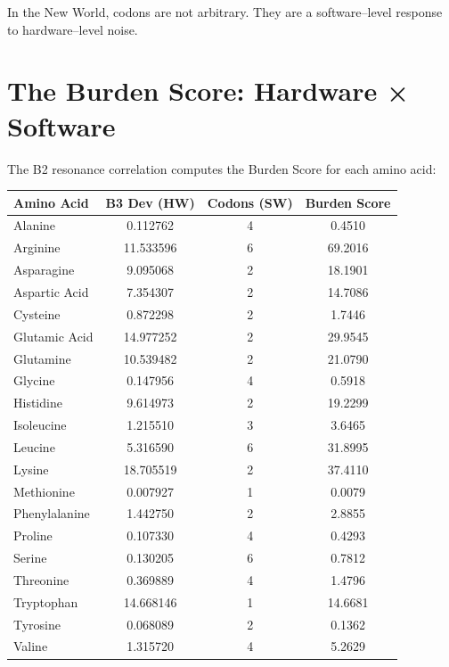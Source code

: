 \documentclass[11pt, letterpaper, openany]{book}
\begin{document}
In the New World, codons are not arbitrary.  
They are a software–level response to hardware–level noise.

\section{The Burden Score: Hardware × Software}

The B2 resonance correlation computes the Burden Score for each amino acid:

\begin{center}
\begin{tabular}{lccc}
\toprule
\textbf{Amino Acid} & \textbf{B3 Dev (HW)} & \textbf{Codons (SW)} & \textbf{Burden Score} \\
\midrule
Alanine        & 0.112762  & 4 & 0.4510 \\
Arginine       & 11.533596 & 6 & 69.2016 \\
Asparagine     & 9.095068  & 2 & 18.1901 \\
Aspartic Acid  & 7.354307  & 2 & 14.7086 \\
Cysteine       & 0.872298  & 2 & 1.7446 \\
Glutamic Acid  & 14.977252 & 2 & 29.9545 \\
Glutamine      & 10.539482 & 2 & 21.0790 \\
Glycine        & 0.147956  & 4 & 0.5918 \\
Histidine      & 9.614973  & 2 & 19.2299 \\
Isoleucine     & 1.215510  & 3 & 3.6465 \\
Leucine        & 5.316590  & 6 & 31.8995 \\
Lysine         & 18.705519 & 2 & 37.4110 \\
Methionine     & 0.007927  & 1 & 0.0079 \\
Phenylalanine  & 1.442750  & 2 & 2.8855 \\
Proline        & 0.107330  & 4 & 0.4293 \\
Serine         & 0.130205  & 6 & 0.7812 \\
Threonine      & 0.369889  & 4 & 1.4796 \\
Tryptophan     & 14.668146 & 1 & 14.6681 \\
Tyrosine       & 0.068089  & 2 & 0.1362 \\
Valine         & 1.315720  & 4 & 5.2629 \\
\bottomrule
\end{tabular}
\end{center}
\end{document}
